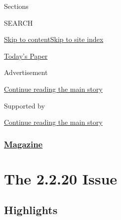 Sections

SEARCH

\protect\hyperlink{site-content}{Skip to
content}\protect\hyperlink{site-index}{Skip to site index}

\href{https://myaccount.nytimes3xbfgragh.onion/auth/login?response_type=cookie\&client_id=vi}{}

\href{https://www.nytimes3xbfgragh.onion/section/todayspaper}{Today's
Paper}

Advertisement

\protect\hyperlink{after-top}{Continue reading the main story}

Supported by

\protect\hyperlink{after-sponsor}{Continue reading the main story}

\hypertarget{magazine}{%
\subsubsection{\texorpdfstring{\href{/section/magazine}{Magazine}}{Magazine}}\label{magazine}}

\hypertarget{the-2220-issue}{%
\section{The 2.2.20 Issue}\label{the-2220-issue}}

\hypertarget{highlights}{%
\subsection{Highlights}\label{highlights}}

